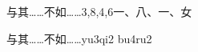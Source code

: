 \begin{entry}{与其……不如……}{3,8,4,6}{⼀、⼋、⼀、⼥}
  \begin{phonetics}{与其……不如……}{yu3qi2 bu4ru2}
  \end{phonetics}
\end{entry}
